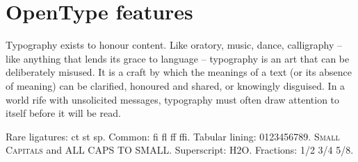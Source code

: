 \documentclass{article}
\begin{document}
\section*{OpenType features}
Typography exists to honour content. Like oratory, music, dance, calligraphy -- like anything that lends its grace to language -- typography is an art that can be deliberately misused. It is a craft by which the meanings of a text (or its absence of meaning) can be clarified, honoured and shared, or knowingly disguised. In a world rife with unsolicited messages, typography must often draw attention to itself before it will be read.

Rare ligatures: ct st sp. Common: fi fl ff ffi. {\liningfont Tabular lining: 0123456789.}
\textsc{Small Capitals} and {ALL CAPS TO SMALL}.
Superscript: H{2}O.
Fractions: {1/2 3/4 5/8}.
\end{document}
